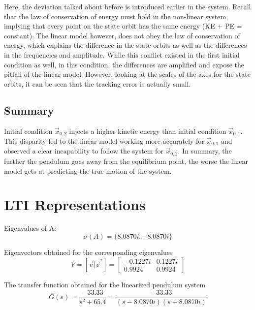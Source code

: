 \documentclass[10pt]{article}
\begin{document}
Here, the deviation talked about before is introduced earlier in the system. Recall that the law of conservation of energy must hold in the non-linear system, implying that every point on the state orbit has the same energy (KE + PE = constant). The linear model however, does not obey the law of conservation of energy, which explains the difference in the state orbits as well as the differences in the frequencies and amplitude. While this conflict existed in the first initial condition as well, in this condition, the differences are amplified and expose the pitfall of the linear model. However, looking at the scales of the axes for the state orbits, it can be seen that the tracking error is actually small. 

\subsection{Summary}
Initial condition $\vec{x}_{0,2}$ injects a higher kinetic energy than initial condition $\vec{x}_{0,1}$. This disparity led to the linear model working more accurately for $\vec{x}_{0,1}$ and observed a clear incapability to follow the system for $\vec{x}_{0,2}$. In summary, the further the pendulum goes away from the equilibrium point, the worse the linear model gets at predicting the true motion of the system.

\section{LTI Representations}
Eigenvalues of A:
\begin{equation*}
    \sigma(A) = \{8.0870i, -8.0870i\}
\end{equation*}

Eigenvectors obtained for the corresponding eigenvalues
\begin{equation*}
    V = [\vec{v}|\vec{v}^*] = \begin{bmatrix}
    -0.1227i & 0.1227i\\ 0.9924 & 0.9924 
    \end{bmatrix}
\end{equation*}

The transfer function obtained for the linearized pendulum system
\begin{equation*}
G(s) = \frac{-33.33}{s^2+65.4} = \frac{-33.33}{(s-8.0870i)(s+8.0870i)} 
\end{equation*}
\end{document}
